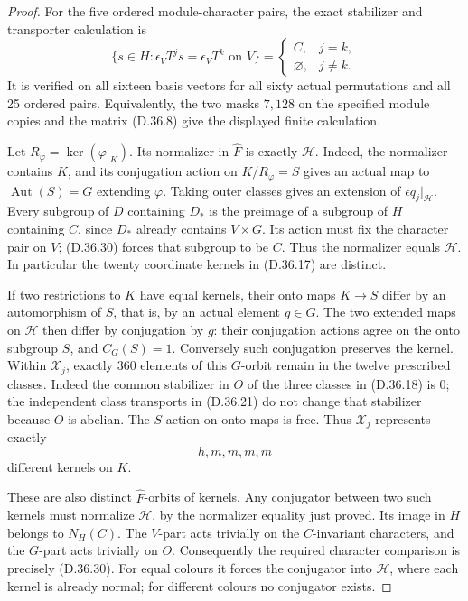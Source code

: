 \begin{proof}
For the five ordered module-character pairs, the exact
stabilizer and transporter calculation is
\[
 \{s\in H:\epsilon_VT^j s=\epsilon_VT^k
                    \text{ on }V\}
   =\begin{cases}C,&j=k,\\\varnothing,&j\ne k.\end{cases}
 \tag{D.36.30}
\]
It is verified on all sixteen basis vectors for all sixty
actual permutations and all 25 ordered pairs.  Equivalently,
the two masks \(7,128\) on the specified module copies and the
matrix \textup{(D.36.8)} give the displayed finite calculation.

Let \(R_\varphi=\ker(\varphi|_K)\).  Its normalizer in
\(\widehat F\) is exactly \(\mathcal H\).
Indeed, the normalizer contains \(K\), and its conjugation
action on \(K/R_\varphi=S\) gives an actual map to
\(\operatorname{Aut}(S)=G\) extending \(\varphi\).
Taking outer classes gives an extension of
\(\epsilon q_j|_{\mathcal H}\).
Every subgroup of \(D\) containing \(D_*\) is the preimage
of a subgroup of \(H\) containing \(C\), since \(D_*\)
already contains \(V\times G\).
Its action must fix the character pair on \(V\);
\textup{(D.36.30)} forces that subgroup to be \(C\).
Thus the normalizer equals \(\mathcal H\).
In particular the twenty coordinate kernels in
\textup{(D.36.17)} are distinct.

If two restrictions to \(K\) have equal kernels, their
onto maps \(K\to S\) differ by an automorphism of \(S\),
that is, by an actual element \(g\in G\).
The two extended maps on \(\mathcal H\) then differ by
conjugation by \(g\): their conjugation actions agree on
the onto subgroup \(S\), and \(C_G(S)=1\).
Conversely such conjugation preserves the kernel.
Within \(\mathscr X_j\), exactly 360 elements of this
\(G\)-orbit remain in the twelve prescribed classes.
Indeed the common stabilizer in \(O\) of the three classes
in \textup{(D.36.18)} is \(0\); the independent class
transports in \textup{(D.36.21)} do not change that
stabilizer because \(O\) is abelian.
The \(S\)-action on onto maps is free.
Thus \(\mathscr X_j\) represents exactly
\[
                           h,m,m,m,m
 \tag{D.36.31}
\]
different kernels on \(K\).

These are also distinct \(\widehat F\)-orbits of kernels.
Any conjugator between two such kernels must normalize
\(\mathcal H\), by the normalizer equality just proved.
Its image in \(H\) belongs to \(N_H(C)\).
The \(V\)-part acts trivially on the \(C\)-invariant
characters, and the \(G\)-part acts trivially on \(O\).
Consequently the required character comparison is precisely
\textup{(D.36.30)}.  For equal colours it forces the
conjugator into \(\mathcal H\), where each kernel is already
normal; for different colours no conjugator exists.


\end{proof}
